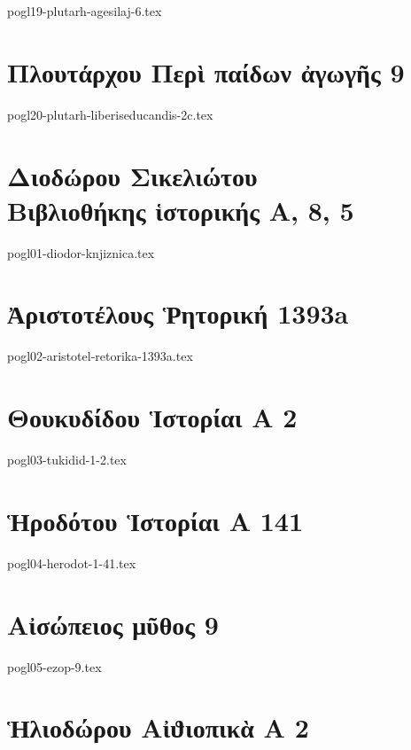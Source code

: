 \documentclass[a4paper,12pt,twoside]{report}
\begin{document}
{pogl19-plutarh-agesilaj-6.tex}

\chapter[Πλουτάρχου Περὶ παίδων ἀγωγῆς]{\textgreek[variant=ancient]{Πλουτάρχου Περὶ παίδων ἀγωγῆς} 9}

{pogl20-plutarh-liberiseducandis-2c.tex}

\chapter[Διοδώρου Βιβλιοθήκης ἱστορικής Α]{\textgreek[variant=ancient]{Διοδώρου Σικελιώτου \\Βιβλιοθήκης ἱστορικής Α,} 8, 5}

{pogl01-diodor-knjiznica.tex}

\chapter[Ἀριστοτέλους Ῥητορική]{\textgreek[variant=ancient]{Ἀριστοτέλους Ῥητορική} 1393a}

{pogl02-aristotel-retorika-1393a.tex}

\chapter[Θουκυδίδου Ἱστορίαι Α 2]{\textgreek[variant=ancient]{Θουκυδίδου Ἱστορίαι Α} 2}

{pogl03-tukidid-1-2.tex}

\chapter[Ἡροδότου Ἱστορίαι Α 141]{\textgreek[variant=ancient]{Ἡροδότου Ἱστορίαι Α} 141}

{pogl04-herodot-1-41.tex}

\chapter[Αἰσώπειος μῦθος 9]{\textgreek[variant=ancient]{Αἰσώπειος μῦθος} 9}

{pogl05-ezop-9.tex}

\chapter[Ἡλιοδώρου Αἰϑιοπικὰ Α]{\textgreek[variant=ancient]{Ἡλιοδώρου Αἰϑιοπικὰ Α} 2}
\end{document}
